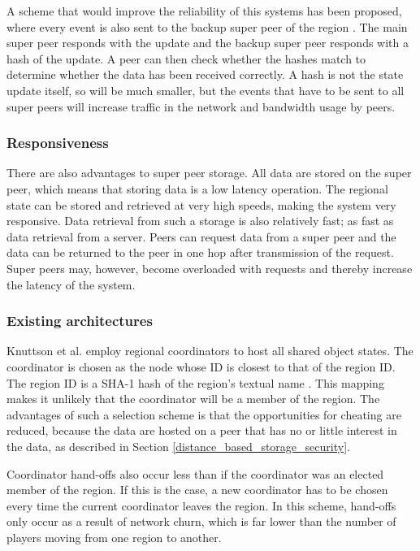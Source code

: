 \documentclass[10pt,a4paper,journal,cspaper,compsoc]{IEEEtran}
\begin{document}
A scheme that would improve the reliability of this systems has been proposed, where every event is also sent to the backup super peer of the region
\cite{past_storage_focus}. The main super peer responds with the update and the backup super peer responds with a hash of the update. A peer can then
check whether the hashes match to determine whether the data has been received correctly. A hash is not the state update itself, so will be much
smaller, but the events that have to be sent to all super peers will increase traffic in the network and bandwidth usage by peers.

\subsubsection{Responsiveness}
There are also advantages to super peer storage. All data are stored on the super peer, which means that storing data is a low latency operation. The
regional state can be stored and retrieved at very high speeds, making the system very responsive. Data retrieval from such a storage is also
relatively fast; as fast as data retrieval from a server. Peers can request data from a super peer and the data can be returned to the peer in one
hop after transmission of the request. Super peers may, however, become overloaded with requests and thereby increase the latency of the system.

\subsubsection{Existing architectures}

Knuttson et al. \cite{knutsson_p2p_first} employ regional coordinators to host all shared object states. The coordinator is chosen as the node whose
ID is closest to that of the region ID. The region ID is a SHA-1 hash of the region's textual name \cite{SHA}. This mapping makes it unlikely that
the coordinator will be a member of the region. The advantages of such a selection scheme is that the opportunities for cheating are reduced, because
the data are hosted on a peer that has no or little interest in the data, as described in Section \ref{distance_based_storage_security}.

Coordinator hand-offs also occur less than if the coordinator was an elected member of the region. If this is the case, a new coordinator has to be
chosen every time the current coordinator leaves the region. In this scheme, hand-offs only occur as a result of network churn, which is far lower
than the number of players moving from one region to another.
\end{document}
